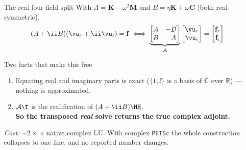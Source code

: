 \documentclass[aspectratio=169,10pt]{beamer}
\begin{document}
\begin{frame}{The real four-field split}
With $A=\mathbf K-\omega^2\mathbf M$ and $B=\eta\mathbf K+\omega\mathbf C$ (both real symmetric),
\[
  (A+\ii B)(\vu_r+\ii\vu_i)=\mathbf f
  \;\Longleftrightarrow\;
  \underbrace{\begin{bmatrix} A & -B\\ B & \phantom{-}A\end{bmatrix}}_{\mathcal A}
  \begin{bmatrix}\vu_r\\ \vu_i\end{bmatrix}
  =\begin{bmatrix}\mathbf f_r\\ \mathbf f_i\end{bmatrix}
\]
\begin{block}{Two facts that make this free}
\begin{enumerate}
  \item Equating real and imaginary parts is exact ($\{1,\ii\}$ is a basis of
        $\mathbb C$ over $\mathbb R$) --- nothing is approximated.
  \item $\mathcal A\T$ is the realification of $(A+\ii B)\HH$. \\
        \textbf{So the transposed \emph{real} solve returns the true complex
        adjoint.}
\end{enumerate}
\end{block}
\emph{Cost:} $\sim2\times$ a native complex LU. With complex \texttt{PETSc} the
whole construction collapses to one line, and no reported number changes.
\end{frame}
\end{document}
